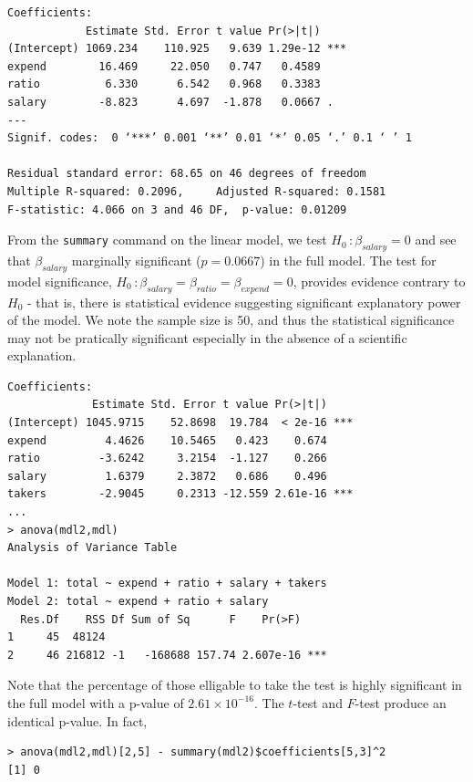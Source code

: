 \documentclass{homework}
\begin{document}
\begin{minipage}{.6\textwidth}
{\small \begin{verbatim}
Coefficients:
            Estimate Std. Error t value Pr(>|t|)    
(Intercept) 1069.234    110.925   9.639 1.29e-12 ***
expend        16.469     22.050   0.747   0.4589    
ratio          6.330      6.542   0.968   0.3383    
salary        -8.823      4.697  -1.878   0.0667 .  
---
Signif. codes:  0 ‘***’ 0.001 ‘**’ 0.01 ‘*’ 0.05 ‘.’ 0.1 ‘ ’ 1 

Residual standard error: 68.65 on 46 degrees of freedom
Multiple R-squared: 0.2096,     Adjusted R-squared: 0.1581 
F-statistic: 4.066 on 3 and 46 DF,  p-value: 0.01209 
\end{verbatim}}
\end{minipage}
\begin{minipage}{.4\textwidth}
From the \texttt{summary} command on the linear model, we test $H_0\,:\beta_{salary} = 0$ and see that $\beta_{salary}$ marginally significant ($p = 0.0667$) in the full model. The test for model significance, $H_0\,:\beta_{salary} = \beta_{ratio} = \beta_{expend} = 0$, provides  evidence contrary to $H_0$ - that is, there is statistical evidence suggesting significant explanatory power of the model. We note the sample size is 50, and thus the statistical significance may not be pratically significant especially in the absence of a scientific explanation. 
\end{minipage}


\begin{minipage}{.6\textwidth}
{\small \begin{verbatim}
Coefficients:
             Estimate Std. Error t value Pr(>|t|)    
(Intercept) 1045.9715    52.8698  19.784  < 2e-16 ***
expend         4.4626    10.5465   0.423    0.674    
ratio         -3.6242     3.2154  -1.127    0.266    
salary         1.6379     2.3872   0.686    0.496    
takers        -2.9045     0.2313 -12.559 2.61e-16 ***
...
> anova(mdl2,mdl) 
Analysis of Variance Table

Model 1: total ~ expend + ratio + salary + takers
Model 2: total ~ expend + ratio + salary
  Res.Df    RSS Df Sum of Sq      F    Pr(>F)    
1     45  48124                                  
2     46 216812 -1   -168688 157.74 2.607e-16 ***
\end{verbatim}}
\end{minipage}
\begin{minipage}{.4\textwidth}
Note that the percentage of those elligable to take the test is highly significant in the full model with a p-value of $2.61\times10^{-16}$. The $t$-test and $F$-test produce an identical p-value.  In fact,
{\footnotesize \begin{verbatim}
> anova(mdl2,mdl)[2,5] - summary(mdl2)$coefficients[5,3]^2 
[1] 0
\end{verbatim}
}

\end{minipage}
\end{document}
